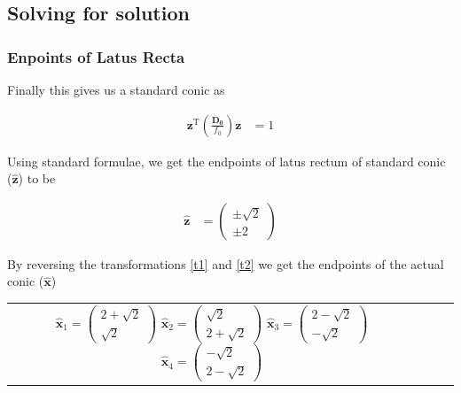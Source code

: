 \documentclass{beamer}
\providecommand{\brak}[1]{\ensuremath{\left(#1\right)}}
\theoremstyle{remark}
\newcommand{\myvec}[1]{\ensuremath{\begin{pmatrix}#1\end{pmatrix}}}
\let\vec\mathbf
\numberwithin{equation}{section}
\begin{document}
\subsection{Solving for solution}
\begin{frame}
    \frametitle{Enpoints of Latus Recta}
    
    Finally this gives us a standard conic as 

    \begin{align}
        \vec{z}^\text{T}\brak{\frac{\vec{D_0}}{f_0}}\vec{z} &= 1 \label{standard_conic}
    \end{align}

    Using standard formulae, we get the endpoints of latus rectum of standard conic ($\vec{\hat{z}}$) to be 

    \begin{align}
        \vec{\hat{z}} &= \myvec{\pm \sqrt{2} \\ \pm 2}
    \end{align}

    By reversing the transformations \eqref{t1} and \eqref{t2} we get the endpoints of the actual conic ($\vec{\hat{x}}$)

    \begin{center}
        \begin{tabular}{c c c c}
            $\vec{\hat{x}}_1 = \myvec{2+\sqrt{2} \\ \sqrt{2}}$
            $\vec{\hat{x}}_2 = \myvec{\sqrt{2} \\ 2+\sqrt{2}}$
            $\vec{\hat{x}}_3 = \myvec{2-\sqrt{2} \\ -\sqrt{2}}$
            $\vec{\hat{x}}_4 = \myvec{-\sqrt{2} \\ 2-\sqrt{2}}$
        \end{tabular}
    \end{center}
        
\end{frame}
\end{document}

